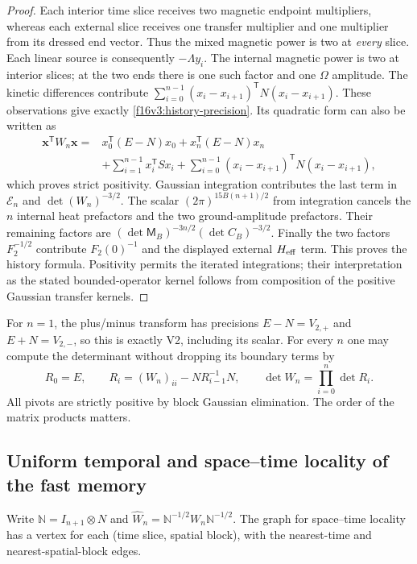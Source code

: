 \documentclass[11pt,oneside]{article}
\begin{document}
\begin{proof}
Each interior time slice receives two magnetic endpoint
multipliers, whereas each external slice receives one
transfer multiplier and one multiplier from its dressed
end vector. Thus the mixed magnetic power is two at
\emph{every} slice. Each linear source is consequently
\(-\Lambda y_i\).
The internal magnetic power is two at interior slices;
at the two ends there is one such factor and one
\(\Omega\) amplitude. The kinetic differences contribute
\(\sum_{i=0}^{n-1}(x_i-x_{i+1})^{\mathsf T}N(x_i-x_{i+1})\).
These observations give exactly \eqref{f16v3:history-precision}.
Its quadratic form can also be written as
\begin{align*}
 \mathbf x^{\mathsf T}W_n\mathbf x
 ={}&x_0^{\mathsf T}(E-N)x_0+x_n^{\mathsf T}(E-N)x_n\\
 &+\sum_{i=1}^{n-1}x_i^{\mathsf T}Sx_i
   +\sum_{i=0}^{n-1}(x_i-x_{i+1})^{\mathsf T}N(x_i-x_{i+1}),
\end{align*}
which proves strict positivity.
Gaussian integration contributes the last term in
\(\mathcal E_n\) and \(\det(W_n)^{-3/2}\).
The scalar \((2\pi)^{15B(n+1)/2}\) from integration cancels
the \(n\) internal heat prefactors and the two ground-amplitude
prefactors. Their remaining factors are
\((\det\mathsf M_B)^{-3n/2}(\det C_B)^{-3/2}\).
Finally the two factors \(F_2^{-1/2}\) contribute \(F_2(0)^{-1}\)
and the displayed external \(H_{\rm eff}\) term.
This proves the history formula. Positivity permits the
iterated integrations; their interpretation as the stated
bounded-operator kernel follows from composition of the
positive Gaussian transfer kernels.
\end{proof}

For \(n=1\), the plus/minus transform has precisions
\(E-N=V_{2,+}\) and \(E+N=V_{2,-}\), so this is exactly V2,
including its scalar. For every \(n\) one may compute the
determinant without dropping its boundary terms by
\[
 R_0=E,\qquad R_i=(W_n)_{ii}-NR_{i-1}^{-1}N,\qquad
                   \det W_n=\prod_{i=0}^n\det R_i .
\]
All pivots are strictly positive by block Gaussian elimination.
The order of the matrix products matters.

\subsection{Uniform temporal and space--time locality of the fast memory}

Write \(\mathbb N=I_{n+1}\otimes N\) and
\(\widehat W_n=\mathbb N^{-1/2}W_n\mathbb N^{-1/2}\).
The graph for space--time locality has a vertex for each
(time slice, spatial block), with the nearest-time and
nearest-spatial-block edges.
\end{document}
